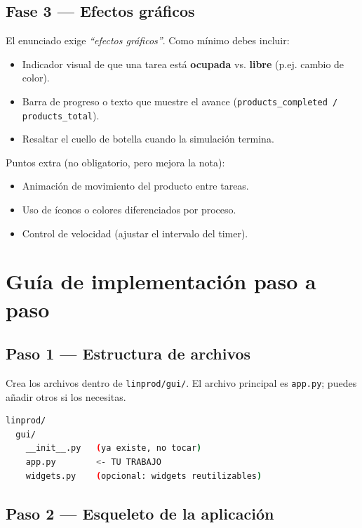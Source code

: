 \documentclass[12pt,letterpaper]{article}
\begin{document}
\subsection{Fase 3 — Efectos gráficos}

El enunciado exige \emph{``efectos gráficos''}. Como mínimo debes incluir:

\begin{itemize}[leftmargin=2em]
    \item Indicador visual de que una tarea está \textbf{ocupada} vs.
          \textbf{libre} (p.ej. cambio de color).
    \item Barra de progreso o texto que muestre el avance
          (\texttt{products\_completed / products\_total}).
    \item Resaltar el cuello de botella cuando la simulación termina.
\end{itemize}

Puntos extra (no obligatorio, pero mejora la nota):

\begin{itemize}[leftmargin=2em]
    \item Animación de movimiento del producto entre tareas.
    \item Uso de íconos o colores diferenciados por proceso.
    \item Control de velocidad (ajustar el intervalo del timer).
\end{itemize}

\section{Guía de implementación paso a paso}

\subsection{Paso 1 — Estructura de archivos}

Crea los archivos dentro de \texttt{linprod/gui/}. El archivo principal es
\texttt{app.py}; puedes añadir otros si los necesitas.

\begin{lstlisting}[language=bash, numbers=none]
linprod/
  gui/
    __init__.py   (ya existe, no tocar)
    app.py        <- TU TRABAJO
    widgets.py    (opcional: widgets reutilizables)
\end{lstlisting}

\subsection{Paso 2 — Esqueleto de la aplicación}
\end{document}
